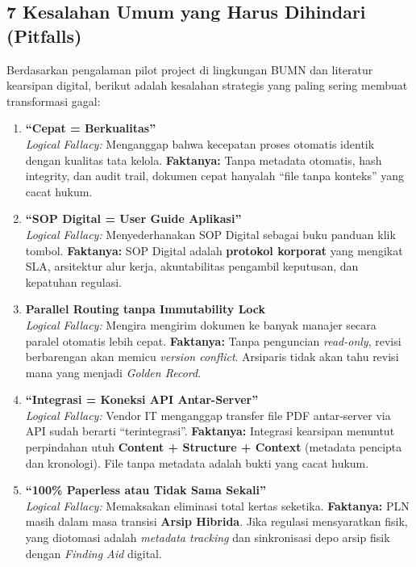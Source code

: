 \documentclass[11pt,a4paper]{article}
\begin{document}
\newpage

\subsection{7 Kesalahan Umum yang Harus Dihindari (Pitfalls)}
Berdasarkan pengalaman pilot project di lingkungan BUMN dan literatur kearsipan digital, berikut adalah kesalahan strategis yang paling sering membuat transformasi gagal:

\begin{enumerate}
    \item \textbf{``Cepat = Berkualitas''} \\ 
    \textit{Logical Fallacy:} Menganggap bahwa kecepatan proses otomatis identik dengan kualitas tata kelola. \textbf{Faktanya:} Tanpa metadata otomatis, hash integrity, dan audit trail, dokumen cepat hanyalah ``file tanpa konteks'' yang cacat hukum.
    
    \item \textbf{``SOP Digital = User Guide Aplikasi''} \\ 
    \textit{Logical Fallacy:} Menyederhanakan SOP Digital sebagai buku panduan klik tombol. \textbf{Faktanya:} SOP Digital adalah \textbf{protokol korporat} yang mengikat SLA, arsitektur alur kerja, akuntabilitas pengambil keputusan, dan kepatuhan regulasi.
    
    \item \textbf{Parallel Routing tanpa Immutability Lock} \\ 
    \textit{Logical Fallacy:} Mengira mengirim dokumen ke banyak manajer secara paralel otomatis lebih cepat. \textbf{Faktanya:} Tanpa penguncian \textit{read-only}, revisi berbarengan akan memicu \textit{version conflict}. Arsiparis tidak akan tahu revisi mana yang menjadi \textit{Golden Record}.
    
    \item \textbf{``Integrasi = Koneksi API Antar-Server''} \\ 
    \textit{Logical Fallacy:} Vendor IT menganggap transfer file PDF antar-server via API sudah berarti ``terintegrasi''. \textbf{Faktanya:} Integrasi kearsipan menuntut perpindahan utuh \textbf{Content + Structure + Context} (metadata pencipta dan kronologi). File tanpa metadata adalah bukti yang cacat hukum.
    
    \item \textbf{``100\% Paperless atau Tidak Sama Sekali''} \\ 
    \textit{Logical Fallacy:} Memaksakan eliminasi total kertas seketika. \textbf{Faktanya:} PLN masih dalam masa transisi \textbf{Arsip Hibrida}. Jika regulasi mensyaratkan fisik, yang diotomasi adalah \textit{metadata tracking} dan sinkronisasi depo arsip fisik dengan \textit{Finding Aid} digital.
    

\end{enumerate}
\end{document}

